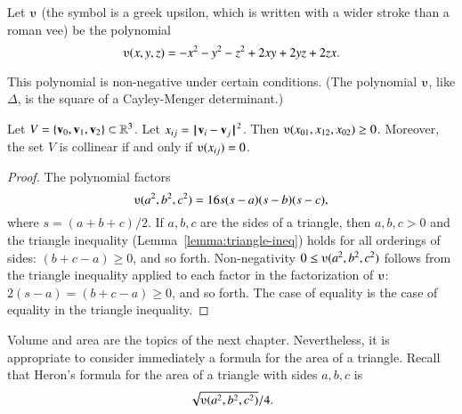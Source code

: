 \begin{definition}[$\ups$]\label{def:ups}
Let $\ups$ (the symbol is a greek upsilon, which is written with a
wider stroke than a roman vee) be the polynomial
\begin{displaymath}\ups(x,y,z) = -x^2 - y^2 - z^2 + 2 x y + 2 y z + 2
  z x.\end{displaymath}
%
\end{definition}



This polynomial is non-negative under certain conditions. (The polynomial
$\ups$, like $\Delta$, 
is the square of a Cayley-Menger determinant.)  


\begin{lemma}[]\label{lemma:ups} Let
  $V=\{{\mathbf v}_0,{\mathbf v}_1,{\mathbf v}_2\}\subset\mathbb{R}^3$.  Let $x_{ij} =
  \norm{\v_i}{\v_j}^2$.  Then $\ups(x_{01},x_{12},x_{02})\ge 0$.
  Moreover, the set $V$ is collinear if and only if $\ups(x_{ij}) =
  0$.%
\end{lemma}

\begin{proof}
The polynomial factors
\begin{displaymath}
\ups(a^2,b^2,c^2) = 16 s (s-a) (s-b)
  (s-c),
\end{displaymath}
where $s = (a+b+c)/2$.  If $a,b,c$ are the sides of a triangle, then
$a,b,c>0$ and the triangle inequality (Lemma~\ref{lemma:triangle-ineq})
holds for all orderings of sides: $(b+c-a)\ge 0$, and so forth.
Non-negativity $0\le \ups(a^2,b^2,c^2)$ follows from the triangle
inequality applied to each factor in the factorization of $\ups$:
$2(s-a) = (b+c-a) \ge0$, and so forth.  The case of equality is the
case of equality in the triangle inequality.
%
%
\end{proof}


%
Volume and area are the topics of the next chapter.  Nevertheless, it
is appropriate to consider immediately a formula for the area of a
triangle.  Recall that Heron's formula for the area of a triangle with
sides $a,b,c$
is \begin{displaymath}\sqrt{\ups(a^2,b^2,c^2)}/4.\end{displaymath}

